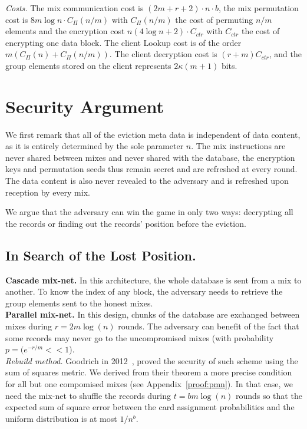 \documentclass[USenglish,oneside,twocolumn]{article}
\begin{document}
\noindent\textit{Costs.} The mix communication cost is $ (2m+r+2) \cdot n \cdot b$, the mix permutation cost is $8m \log n \cdot C_{\Pi}(n/m)$ with $C_{\Pi}(n/m)$ the cost of permuting $n/m$ elements and the encryption cost $n (4 \log n +2) \cdot C_{ctr}$ with $C_{ctr}$ the cost of encrypting one data block. The client Lookup cost is of the order $m (C_{\Pi}(n)+C_{\Pi}(n/m))$. The client decryption cost is $(r+m) C_{ctr}$, and the group elements stored on the client represents $2\kappa (m+1)$ bits.\\

\vspace{-1cm}

\section{Security Argument}\label{Security}

We first remark that all of the eviction meta data is independent of data content, as it is entirely determined by the sole parameter $n$. The mix instructions are never shared between mixes and never shared with the database, the encryption keys and permutation seeds thus remain secret and are refreshed at every round. The data content is also never revealed to the adversary and is refreshed upon reception by every mix.

We argue that the adversary can win the game in only two ways: decrypting all the records or finding out the records' position before the eviction. 

\vspace{-.5cm}

\subsection{In Search of the Lost Position.}

\noindent\textbf{Cascade mix-net.}
In this architecture, the whole database is sent from a mix to another. To know the index of any block, the adversary needs to retrieve the group elements sent to the honest mixes.\\

\noindent\textbf{Parallel mix-net.}
In this design, chunks of the database are exchanged between mixes during $r=2m\log(n)$ rounds. The adversary can benefit of the fact that some records may never go to the uncompromised mixes (with probability $p=(e^{-r/m} << 1$).\\

\noindent\textit{Rebuild method.} Goodrich in 2012~\cite{goodrich2012anonymous}, proved the security of such scheme using the sum of squares metric. We derived from their theorem a more precise condition for all but one compomised mixes (see Appendix~\ref{proof:pmn}). In that case, we need the mix-net  to shuffle the records during $t=bm\log(n)$ rounds so that the expected sum of square error between the card assignment probabilities and the uniform distribution is at most $1/n^b$.
\end{document}
